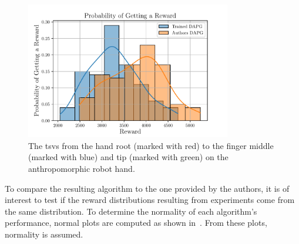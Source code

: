 \begin{figure}[!h]
	\begin{center}
		\includegraphics[width=0.8\textwidth]{chapters/3-in-hand-manipulation/fig/probability-of-getting-a-reward.pdf}
	\end{center}
	\caption{The \gls{tsv}s from the hand root (marked with red) to the finger middle (marked with blue) and tip (marked with green) on the anthropomorphic robot hand.}
	\label{fig:probability-of-getting-a-reward}
\end{figure}

To compare the resulting algorithm to the one provided by the authors, it is of interest to test if the reward distributions resulting from experiments come from the same distribution. To determine the normality of each algorithm's performance, normal plots are computed as shown in~. From these plots, normality is assumed.


